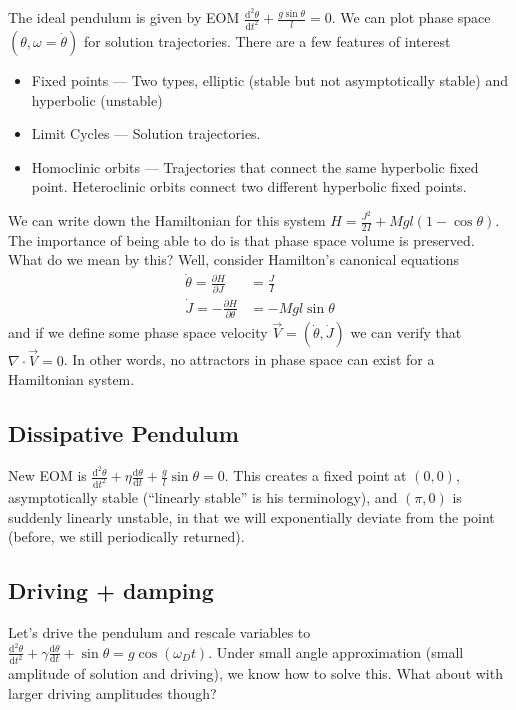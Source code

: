 \documentclass[12pt]{article}
\newcommand{\rd}[2]{\frac{\mathrm{d}#1}{\mathrm{d}#2}}
\newcommand{\pd}[2]{\frac{\partial#1}{\partial#2}}
\newcommand{\rtd}[2]{\frac{\mathrm{d}^2#1}{\mathrm{d}#2^2}}
\begin{document}
The ideal pendulum is given by EOM $\rtd{\theta}{t} + \frac{g\sin\theta}{l} =
0$. We can plot phase space $(\theta, \omega = \dot{\theta})$ for solution
trajectories. There are a few features of interest
\begin{itemize}
    \item Fixed points --- Two types, elliptic (stable but not asymptotically
        stable) and hyperbolic (unstable)
    \item Limit Cycles --- Solution trajectories.
    \item Homoclinic orbits --- Trajectories that connect the same hyperbolic
        fixed point. Heteroclinic orbits connect two different hyperbolic fixed
        points.
\end{itemize}

We can write down the Hamiltonian for this system $H = \frac{J^2}{2I} +
Mgl(1-\cos\theta)$. The importance of being able to do is that phase space
volume is preserved. What do we mean by this? Well, consider Hamilton's
canonical equations
\begin{align}
    \dot{\theta} = \pd{H}{J} &= \frac{J}{I} \nonumber\\
    \dot{J} = -\pd{H}{\theta} &= -Mgl\sin\theta
\end{align}
and if we define some phase space velocity $\vec{V} = \left( \dot{\theta},
\dot{J} \right)$ we can verify that $\nabla \cdot \vec{V} = 0$. In other words,
no attractors in phase space can exist for a Hamiltonian system.

\subsection{Dissipative Pendulum}

New EOM is $\rtd{\theta}{t} + \eta \rd{\theta}{t} + \frac{g}{l}\sin\theta = 0$.
This creates a fixed point at $(0,0)$, asymptotically stable (``linearly
stable'' is his terminology), and $(\pi,0)$ is suddenly linearly unstable, in
that we will exponentially deviate from the point (before, we still
periodically returned).

\subsection{Driving + damping}

Let's drive the pendulum and rescale variables to $\rtd{\theta}{t} + \gamma
\rd{\theta}{t} + \sin\theta = g\cos(\omega_D t)$. Under small angle
approximation (small amplitude of solution and driving), we know how to solve
this. What about with larger driving amplitudes though?
\end{document}
